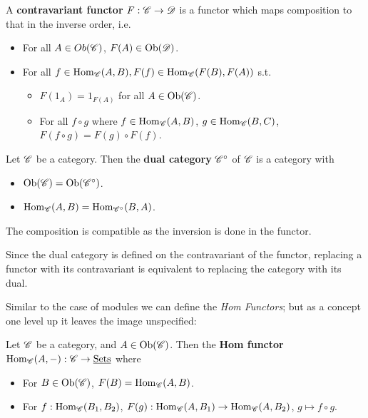 \documentclass{article}
\begin{document}
\begin{definition}
    A \textbf{contravariant functor} $F: \mathscr{C} \to \mathscr{D}$ is a functor which maps composition to that in the inverse order, i.e.
    \begin{itemize}
        \item For all $A \in Ob(\mathscr{C})$, $F(A) \in \mathrm{Ob}(\mathscr{D})$.
        \item For all $f \in \mathrm{Hom}_{\mathscr{C}}(A, B), F(f) \in \mathrm{Hom}_{\mathscr{C}}(F(B), F(A))$ s.t. 
        \begin{itemize}
            \item $F(1_A) = 1_{F(A)}$ for all $A \in \mathrm{Ob}(\mathscr{C})$.
            \item For all $f \circ g$ where $f \in \mathrm{Hom}_{\mathscr{C}}(A, B)$, $g \in \mathrm{Hom}_{\mathscr{C}}(B, C)$, $F(f \circ g) = F(g) \circ F(f)$.
        \end{itemize}
    \end{itemize}
\end{definition}

\begin{definition}
    Let $\mathscr{C}$ be a category. Then the \textbf{dual category} $\mathscr{C}^{\circ}$ of $\mathscr{C}$ is a category with
    \begin{itemize}
        \item $\mathrm{Ob}(\mathscr{C}) = \mathrm{Ob}(\mathscr{C}^{\circ})$.
        \item $\mathrm{Hom}_{\mathscr{C}}(A, B) = \mathrm{Hom}_{\mathscr{C}^{\circ}}(B, A)$. 
    \end{itemize}
    The composition is compatible as the inversion is done in the functor. 
\end{definition}

\begin{remark}
    Since the dual category is defined on the contravariant of the functor, replacing a functor with its contravariant is equivalent to replacing the category with its dual.
\end{remark}

Similar to the case of modules we can define the \emph{Hom Functors}; but as a concept one level up it leaves the image unspecified:

\begin{definition}
    Let $\mathscr{C}$ be a category, and $A \in \mathrm{Ob}(\mathscr{C})$. Then the \textbf{Hom functor} $\mathrm{Hom}_{\mathscr{C}}(A, -): \mathscr{C} \to \underline{\textup{Sets}}$ where
    \begin{itemize}
        \item For $B \in \mathrm{Ob}(\mathscr{C})$, $F(B) = \mathrm{Hom}_{\mathscr{C}}(A, B)$.
        \item For $f: \mathrm{Hom}_{\mathscr{C}}(B_1, B_2)$, $F(g): \mathrm{Hom}_{\mathscr{C}}(A, B_1) \to \mathrm{Hom}_{\mathscr{C}}(A, B_2)$, $g\mapsto f \circ g$. 
    \end{itemize}
\end{definition}
\end{document}
